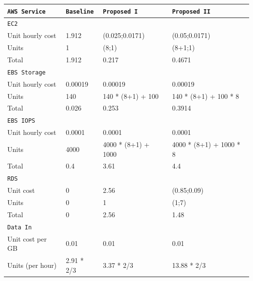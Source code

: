 \documentclass{uvamscse}
\begin{document}
\begin{table}[H]
\begin{center}
\begin{tabular}{llll}
  \texttt{AWS Service}               & \texttt{Baseline}   & \texttt{Proposed I}  & \texttt{Proposed II}  \\
  \hline
  \texttt{EC2} \\
  Unit hourly cost                   & 1.912               & (0.025;0.0171)       & (0.05;0.0171)         \\
  Units                              & 1                   & (8;1)                & (8+1;1)                 \\
  Total                              & 1.912               & 0.217                & 0.4671                \\
  \hline
  \texttt{EBS Storage} \\
  Unit hourly cost                   & 0.00019             & 0.00019              & 0.00019               \\
  Units                              & 140                 & 140 * (8+1) + 100    & 140 * (8+1) + 100 * 8 \\
  Total                              & 0.026               & 0.253                & 0.3914                \\
  \hline
  \texttt{EBS IOPS} \\
  Unit hourly cost                   & 0.0001              & 0.0001               & 0.0001                \\
  Units                              & 4000                & 4000 * (8+1) + 1000  & 4000 * (8+1) + 1000 * 8 \\
  Total                              & 0.4                 & 3.61                 & 4.4 \\
  \hline
  \texttt{RDS} \\
  Unit cost                          & 0                   & 2.56                 & (0.85;0.09)              \\
  Units                              & 0                   & 1                    & (1;7)                   \\
  Total                              & 0                   & 2.56                 &  1.48                  \\
  \hline
  \texttt{Data In} \\
  Unit cost per GB                   & 0.01                & 0.01                & 0.01              \\
  Units (per hour)                   & 2.91 * 2/3          & 3.37 * 2/3          & 13.88 * 2/3  \\

\end{tabular}
\end{center}
\end{table}
\end{document}
